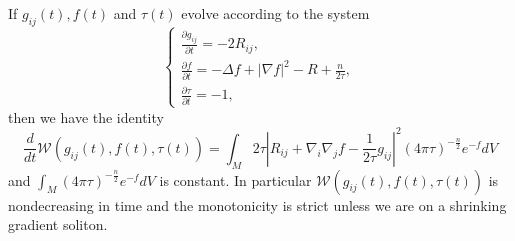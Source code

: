 \begin{proposition}
  \label{prop:cz-monotonicity-of-perelmans-w-functional}
If $g_{ij}(t), f(t)$ and $\tau(t)$ evolve according to the system
$$
      \left\{
       \begin{array}{lll}
       \displaystyle
\frac{\partial g_{ij}}{\partial t}=-2R_{ij},
          \\[4mm]
      \displaystyle
\frac{\partial f}{\partial t}=-\Delta f+|\nabla
f|^2-R+\frac{n}{2\tau},
          \\[4mm]
      \displaystyle
\frac{\partial \tau}{\partial t}=-1,
       \end{array}
      \right.
$$
then we have the identity
$$
\frac{d} {d t} \mathcal{W}(g_{ij}(t),f(t),\tau(t))=\int_M
2\tau\left|R_{ij}+\nabla_i\nabla_jf-\frac
{1}{2\tau}g_{ij}\right|^2 (4\pi\tau)^{-\frac{n}{2}} e^{-f}dV
$$
and $\int_M(4\pi\tau)^{-\frac{n}{2}}e^{-f}dV$ is constant. In
particular $\mathcal{W}(g_{ij}(t),f(t),\tau(t))$ is nondecreasing
in time and the monotonicity is strict unless we are on a
shrinking gradient soliton.
\end{proposition}


